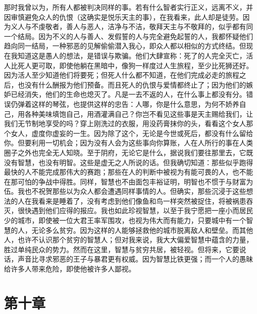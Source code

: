 那时我曾以为，所有人都被判决同样的事。若有什么智者实行正义，远离不义，并因审慎避免众人的仇恨（这确实是悦乐天主的事），在我看来，此人却是徒劳。因为义人与不虔敬者，善人与恶人，洁净与不洁，敬拜天主与不敬拜的，似乎都有同一个结局。因为不义的人与善人、发假誓的人与完全避免起誓的人，我都怀疑他们趋向同一结局，一种邪恶的见解偷偷潜入我心，即众人都以相似的方式终结。但现在我知道这是愚人的想法，是错误与欺骗。他们大肆宣称：死了的人完全灭亡，活人比死人更可取，即使他躺在黑暗中，像狗一样度过人生旅程，至少比死狮还好。因为活人至少知道他们将要死；但死人什么都不知道，在他们完成必走的旅程之后，也没有什么酬报为他们预备。而且死人的仇恨与爱情都终止了；因为他们的嫉妒已经消失，他们的生命也熄灭了。凡是一去不返的人，在什么事上都没有分。错误仍弹着这样的琴弦，也提供这样的忠告：人哪，你是什么意思，为何不娇养自己，用各种美味填饱自己，用酒灌满自己？你岂不看见这些事是天主赐给我们，让我们无节制地享受的吗？穿上刚洗过的衣服，用没药膏抹你的头，看看这个女人那个女人，虚度你虚妄的一生。因为除了这个，无论是今世或死后，都没有什么留给你。但要利用一切机会；因为没有人会为这些事向你算账，人在人所行的事在人类圈子之外也完全无人知晓。至于阴府，无论它是什么，据说我们要往那里去，它既没有智慧，也没有明智。这些是虚无之人所说的话。但我确切知道：那些似乎跑得最快的人不能完成那伟大的赛跑；那些在人的判断中被视为有能可畏的人，也不能在那可怕的争战中得胜。同样，智慧也不由面包丰裕证明，明智也不惯于与财富为伍。我也不祝贺那些以为众人都会遭遇同样事情的人。但确实，那些沉浸于这些想法的人在我看来是睡着了，没有考虑到他们像鱼和鸟一样突然被捉住，将被祸患吞灭，很快遇到他们应得的报应。我也如此珍视智慧，以至于我宁愿把一座小而居民少的城市，即使被一位大君王率军围攻，也视为伟大而有能力，只要城中有一个智慧的人，无论多么贫穷。因为这样的人能够拯救他的城市脱离敌人和壁垒。而其他人，也许不认识那个贫穷的智慧人；但对我来说，我大大偏爱智慧中蕴含的力量，胜过单纯民众的势力。然而在这里，智慧与贫穷共居，被轻视。但将来，它要说话，声音比寻求邪恶的王子与暴君更有权威。因为智慧比铁更强；而一个人的愚昧给许多人带来危险，即使他被许多人鄙视。\par


\section{第十章}

